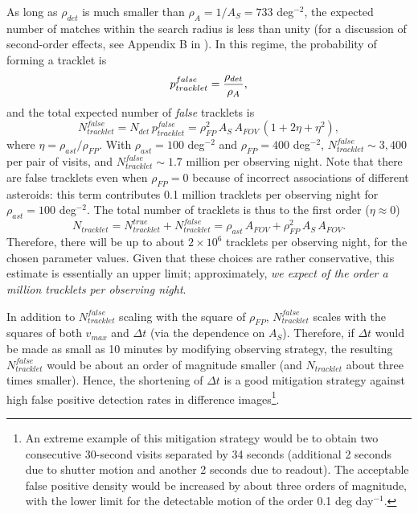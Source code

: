 \documentclass[12pt,preprint]{aastex}
\begin{document}
As long as $\rho_{det}$ is much smaller than $\rho_A = 1/A_S = 733$ deg$^{-2}$, the expected number of 
matches within the search radius is less than unity (for a discussion of second-order effects, see Appendix B 
in \citealt{IVLZ2005}). In this regime, the probability of forming a tracklet is 
\begin{equation}
                 p_{tracklet}^{false} =   { \rho_{det}  \over \rho_A}, 
\end{equation}
and the total expected number of {\it false} tracklets is 
\begin{equation}
           N_{tracklet}^{false} = N_{det} \, p_{tracklet}^{false} =  \rho^2_{FP}  \, A_S \, A_{FOV} \,
                                \left(1 + 2 \eta + \eta^2\right),
\end{equation}
where $\eta = \rho_{ast}  / \rho_{FP}$. With $\rho_{ast} = 100$ deg$^{-2}$ and  $\rho_{FP} = 400$ deg$^{-2}$,
$N_{tracklet}^{false} \sim 3,400$ per pair of visits, and $N_{tracklet}^{false} \sim 1.7$ million per observing night. 
Note that there are false tracklets even when $\rho_{FP} = 0$ because of incorrect associations of different asteroids:
this term contributes 0.1 million tracklets per observing night for $\rho_{ast} = 100$ deg$^{-2}$. The total
number of tracklets is thus to the first order ($\eta \approx 0$)
\begin{equation}
   N_{tracklet} =  N_{tracklet}^{true} + N_{tracklet}^{false} = \rho_{ast}  \, A_{FOV} + \rho^2_{FP}  \, A_S \, A_{FOV}. 
\end{equation}
Therefore, there will be up to about $2\times10^6$ tracklets per observing night, for the chosen parameter 
values. Given that these choices are rather conservative, this estimate is essentially an upper limit;
approximately, {\it we expect of the order a million tracklets per observing night}. 


In addition to $N_{tracklet}^{false}$ scaling with the square of $\rho_{FP}$, $N_{tracklet}^{false}$ scales with the squares of
both $v_{max}$ and  $\Delta t$ (via the dependence on $A_S$). Therefore, if $\Delta t$ would be made
as small as 10 minutes by modifying observing strategy, the resulting $N_{tracklet}^{false}$ would be about an 
order of magnitude smaller (and $N_{tracklet}$ about three times smaller).  Hence, the shortening of $\Delta t$ is 
a good mitigation strategy against high false positive detection rates in difference images\footnote{An
extreme example of this mitigation strategy would be to obtain two consecutive 30-second visits separated 
by 34 seconds (additional 2 seconds due to shutter motion and another 2 seconds due to readout). 
The acceptable false positive density would be increased by about three orders of magnitude, with the
lower limit for the detectable motion of the order 0.1 deg day$^{-1}$.}.
\end{document}
